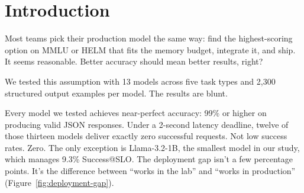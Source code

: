 \documentclass[11pt]{article}
\begin{document}
\begin{abstract}
The deployment gap (the difference between accuracy and Success@SLO) exceeds 90\% for every model we tested.  Twelve of thirteen models achieve near-perfect accuracy while delivering zero production value under realistic latency constraints.

We swept deadline thresholds from 2s to 10s.  At production-realistic deadlines, accuracy has no predictive power for deployment success (Spearman $\rho = 0.09$ at 2s).  Even at a generous 10-second deadline, 10 of 13 models change rank between accuracy and Success@SLO orderings.  The disconnect persists regardless of where the line is drawn.

This holds across vendors and architectures.  Meta, Alibaba, Microsoft, Google, OpenAI, Mistral, 01.AI, and TII models from the US, China, France, and UAE all show the same inversion.  Bigger models that dominate accuracy leaderboards collapse under latency constraints.

We introduce \emph{Success@SLO}, the fraction of requests that are both correct AND arrive on time.  This single metric captures what production systems actually experience.  We also release SpecSLOEval, a framework for measuring structure, accuracy, faithfulness, stability, and latency across five task types through a single evaluation harness.

Accuracy-only evaluation is insufficient for deployment decisions.
\end{abstract}

\section{Introduction}

Most teams pick their production model the same way: find the highest-scoring option on MMLU or HELM that fits the memory budget, integrate it, and ship.  It seems reasonable.  Better accuracy should mean better results, right?

We tested this assumption with 13 models across five task types and 2,300 structured output examples per model.  The results are blunt.

Every model we tested achieves near-perfect accuracy: 99\% or higher on producing valid JSON responses.  Under a 2-second latency deadline, twelve of those thirteen models deliver exactly zero successful requests.  Not low success rates.  Zero.  The only exception is Llama-3.2-1B, the smallest model in our study, which manages 9.3\% Success@SLO.  The deployment gap isn't a few percentage points.  It's the difference between ``works in the lab'' and ``works in production'' (Figure~\ref{fig:deployment-gap}).
\end{document}

